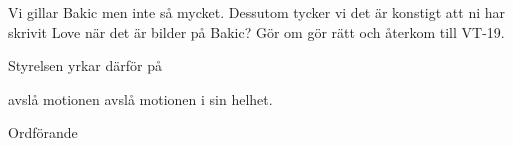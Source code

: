 \documentclass[../_main/handlingar.tex]{subfiles}
\begin{document}
\motionssvar
Vi gillar Bakic men inte så mycket. Dessutom tycker vi det är konstigt att ni har skrivit Love när det är bilder på Bakic? Gör om gör rätt och återkom till VT-19.

Styrelsen yrkar därför på

\begin{attsatser}
	\att avslå motionen avslå motionen i sin helhet.
\end{attsatser}


\begin{signatures}{1}
	\ist
	\signature{Daniel Bakic}{Ordförande}
\end{signatures}
\end{document}
